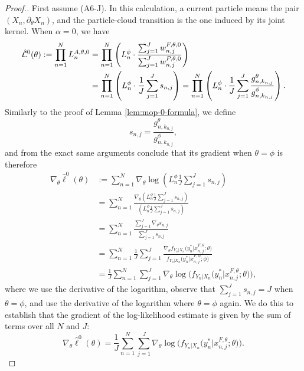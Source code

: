 \begin{proof}[Proof.]
First assume (A6-J). In this calculation, a current particle means the
pair $(X_n,\partial_\theta X_n)$, and the particle-cloud transition is
the one induced by its joint kernel.
When $\alpha=0$, we have
\begin{align}
    \hat{\mathcal{L}}^0(\theta) := \prod_{n=1}^N L_n^{A, \theta, 0} &= \prod_{n=1}^N\left(L_n^\phi \cdot \frac{\sum_{j=1}^J w_{n,j}^{F,\theta,0}}{\sum_{j=1}^J w_{n,j}^{P,\theta,0}}\right)
    \\&
    = \prod_{n=1}^N\left(L_n^\phi \cdot \frac{1}{J}\sum_{j=1}^J s_{n,j}\right) = \prod_{n=1}^N\left(L_n^\phi \cdot \frac{1}{J}\sum_{j=1}^J \frac{g_{n,k_{n,j}}^\theta}{g_{n,k_{n,j}}^\phi}\right).
\end{align}
Similarly to the proof of Lemma \ref{lem:mop-0-formula}, we define 
\begin{equation}
s_{n,j}=\frac{g_{n,k_{n,j}}^\theta}{g_{n,k_{n,j}}^\phi},
\end{equation}
and from the exact same arguments conclude that its gradient when $\theta=\phi$ is therefore 
\begin{align}
    \nabla_\theta \hat{\ell}^0(\theta) &:= \sum_{n=1}^N \nabla_\theta \log\left(L_n^\phi \frac{1}{J} \sum_{j=1}^J s_{n,j}\right) \\
    &= \sum_{n=1}^N \frac{\nabla_\theta \left(L_n^\phi \frac{1}{J} \sum_{j=1}^J s_{n,j}\right)}{\left(L_n^\phi \frac{1}{J} \sum_{j=1}^J s_{n,j}\right)} \\
    &= \sum_{n=1}^N \frac{\sum_{j=1}^J \nabla_\theta s_{n,j}}{\sum_{j=1}^J s_{n,j}} \\
    &= \sum_{n=1}^N \frac{1}{J} \sum_{j=1}^J \frac{\nabla_\theta f_{Y_n|X_{n}}\big(y_n^*|x_{n,j}^{F, \theta}; \theta\big)}{f_{Y_n|X_{n}}\big(y_n^*|x_{n,j}^{F, \phi}; \phi\big)} \\
    &= \frac{1}{J} \sum_{n=1}^N \sum_{j=1}^J \nabla_\theta \log\Big(f_{Y_n|X_{n}}\big(y_n^*|x_{n,j}^{F, \theta}; \theta\big)\Big),
\end{align}
where we use the derivative of the logarithm, observe that $\sum_{j=1}^J s_{n,j} = J$ when $\theta=\phi$, and use the derivative of the logarithm where $\theta=\phi$ again. We do this to establish that the gradient of the log-likelihood estimate is given by the sum of terms over all $N$ and $J$:
\begin{equation}
\nabla_\theta \hat{\ell}^0(\theta) = \frac{1}{J} \sum_{n=1}^N \sum_{j=1}^J \nabla_\theta \log\Big(f_{Y_n|X_{n}}\big(y_n^*|x_{n,j}^{F, \theta}; \theta\big)\Big).
\end{equation}

\end{proof}
